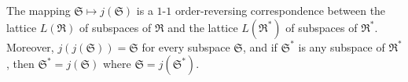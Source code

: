The mapping $\mathfrak{S} \mapsto j(\mathfrak{S})$ is a $1$-$1$ order-reversing correspondence between the lattice $L(\mathfrak{R})$ of subspaces of $\mathfrak{R}$ and the lattice $L(\mathfrak{R}^*)$ of subspaces of $\mathfrak{R}^*$. Moreover, $j(j(\mathfrak{S})) = \mathfrak{S}$ for every subspace $\mathfrak{S}$, and if $\mathfrak{S}^*$ is any subspace of $\mathfrak{R}^*$, then $\mathfrak{S}^* = j(\mathfrak{S})$ where $\mathfrak{S} = j(\mathfrak{S}^*)$.

